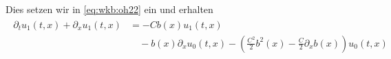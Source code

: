 Dies setzen wir in \eqref{eq:wkb:oh22} ein und erhalten
\begin{align}
\begin{split}\label{eq:wkb:oh222}
\partial_t u_1(t, x) + \partial_x u_1(t, x) &= - C b(x) u_1(t, x) \\
&\quad - b(x) \partial_x u_0(t, x) - \left( \frac{C^2}{2} b^2(x) - \frac{C}{2} \partial_x b(x) \right) u_0(t,x)
\end{split}
\end{align}